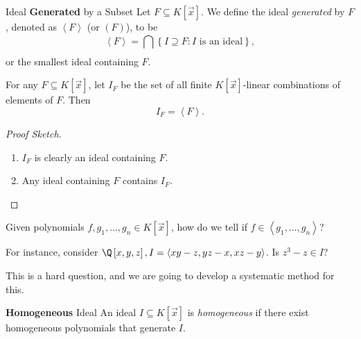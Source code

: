 \documentclass[co439]{subfiles}
\begin{document}
    \begin{definition}{Ideal \textbf{Generated} by a Subset}
        Let $F\subseteq K\left[ \vec{x} \right]$. We define the ideal \emph{generated} by $F$, denoted as $\left< F \right>$ (or $\left( F \right)$), to be
        \begin{equation*}
            \left< F \right> = \bigcap^{}_{} \left\lbrace I\supseteq F: \text{$I$ is an ideal} \right\rbrace, 
        \end{equation*}
        or the smallest ideal containing $F$.
    \end{definition}
    
    \begin{prop}{}
        For any $F\subseteq K\left[ \vec{x} \right]$, let $I_F$ be the set of all finite $K\left[ \vec{x} \right]$-linear combinations of elements of $F$. Then
        \begin{equation*}
            I_F = \left< F \right>. 
        \end{equation*}
    \end{prop}

    \begin{proof}[Proof Sketch]
        \begin{enumerate}
            \item $I_F$ is clearly an ideal containing $F$.
            \item Any ideal containing $F$ contains $I_F$.
        \end{enumerate}
    \end{proof}

    \begin{question}
        Given polynomials $f,g_1,\ldots,g_n\in K\left[ \vec{x} \right]$, how do we tell if $f\in \left< g_1,\ldots,g_n \right>$? 

        For instance, consider $\Q\left[ x,y,z \right], I = \left< xy-z, yz-x,xz-y \right>$. Is $z^{3}-z\in I$? 
    \end{question}

    \begin{answer}
        This is a hard question, and we are going to develop a systematic method for this.
    \end{answer}

    \begin{definition}{\textbf{Homogeneous} Ideal}
        An ideal $I\subseteq K\left[ \vec{x} \right]$ is \emph{homogeneous} if there exist homogeneous polynomials that generate $I$.\footnotemark[1]
        
        \noindent
        \begin{minipage}{\textwidth}
        \end{minipage}
    \end{definition}
    
\end{document}
